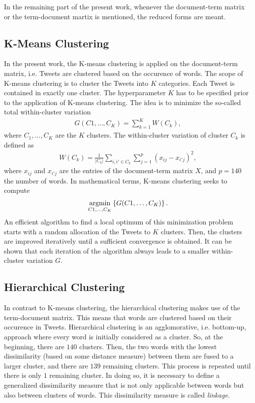 In the remaining part of the present work, whenever the document-term matrix or the term-document martix is mentioned, the reduced forms are meant.

\subsection{K-Means Clustering}\label{subsec:k_means}
In the present work, the K-means clustering is applied on the document-term matrix, i.e. Tweets are clustered based on the occurence of words. The scope of K-means clustering is to cluster the Tweets into $K$ categories. Each Tweet is contained in exactly one cluster. The hyperparameter $K$ has to be specified prior to the application of K-means clustering. The idea is to minimize the so-called total within-cluster variation
\begin{align*}
	G(C1,\dots,C_K) =  \sum_{k=1}^{K} W(C_k),
\end{align*}
where $C_1,...,C_K$ are the $K$ clusters. The within-cluster variation of cluster $C_k$ is defined as
\begin{align*}
	W(C_k) = \frac{1}{|C_k|} \sum_{i, i' \in C_k} \sum_{j=1}^p (x_{ij} - x_{i'j})^2,
\end{align*}
where $x_{ij}$ and $x_{i'j}$ are the entries of the document-term matrix $X$, and $p=140$ the number of words. In mathematical terms, K-means clustering seeks to compute
\begin{align*}
	\operatorname*{argmin}_{C1,\dots,C_K} \left\{G(C1,\dots,C_K) \right\}.
\end{align*}
An efficient algorithm to find a local optimum of this minimization problem starts with a random allocation of the Tweets to $K$ clusters. Then, the clusters are improved iteratively until a sufficient convergence is obtained. It can be shown that each iteration of the algorithm always leads to a smaller within-cluster variation $G$.

\subsection{Hierarchical Clustering}\label{subsec:h_clust}
In contrast to K-means clustering, the hierarchical clustering makes use of the term-document matrix. This means that words are clustered based on their occurence in Tweets. Hierarchical clustering is an agglomorative, i.e. bottom-up, approach where every word is initially considered as a cluster. So, at the beginning, there are $140$ clusters. Then, the two words with the lowest dissimilarity (based on some distance measure) between them are fused to a larger cluster, and there are $139$ remaining clusters. This process is repeated until there is only $1$ remaining cluster. In doing so, it is necessary to define a generalized dissimilarity measure that is not only applicable between words but also between clusters of words. This dissimilarity measure is called \textit{linkage}.